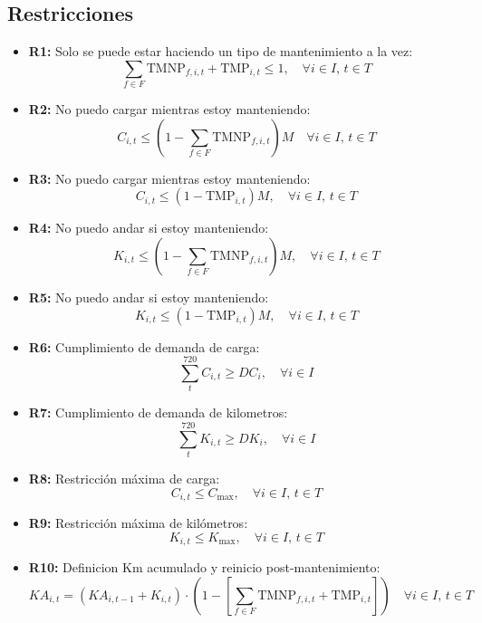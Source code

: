 \documentclass{article}
\begin{document}
\subsection{Restricciones}
\begin{itemize}
    \item \textbf{R1:} Solo se puede estar haciendo un tipo de mantenimiento a la vez:
    \[
    \sum_{f \in F} \text{TMNP}_{f,i,t} + \text{TMP}_{i,t} \leq 1, \quad \forall i \in I, \, t \in T
    \]
    
    \item \textbf{R2:} No puedo cargar mientras estoy manteniendo:
    \[
    C_{i,t} \leq \left(1 - \sum_{f \in F} \text{TMNP}_{f,i,t}\right) M \quad \forall i \in I, \, t \in T
    \]

    \item \textbf{R3:} No puedo cargar mientras estoy manteniendo:
    \[
    C_{i,t} \leq \left(1 - \text{TMP}_{i,t}\right) M, \quad \forall i \in I, \, t \in T
    \]

    \item \textbf{R4:} No puedo andar si estoy manteniendo:
    \[
    K_{i,t} \leq \left(1 - \sum_{f \in F} \text{TMNP}_{f,i,t}\right) M, \quad \forall i \in I, \, t \in T
    \]

    \item \textbf{R5:} No puedo andar si estoy manteniendo:
    \[
    K_{i,t} \leq \left(1 - \text{TMP}_{i,t}\right) M, \quad \forall i \in I, \, t \in T
    \]

    \item \textbf{R6:} Cumplimiento de demanda de carga:
    \[
    \sum_{t}^{720} C_{i,t} \geq DC_{i}, \quad \forall i \in I
    \]

    \item \textbf{R7:} Cumplimiento de demanda de kilometros:
    \[
    \sum_{t}^{720} K_{i,t} \geq DK_{i}, \quad \forall i \in I
    \]

    \item \textbf{R8:} Restricción máxima de carga:
    \[
    C_{i,t} \leq C_{\text{max}}, \quad \forall i \in I, \, t \in T
    \]
    
    \item \textbf{R9:} Restricción máxima de kilómetros:
    \[
    K_{i,t} \leq K_{\text{max}}, \quad \forall i \in I, \, t \in T
    \]

    \item \textbf{R10:} Definicion Km acumulado y reinicio post-mantenimiento:
    \[
    KA_{i,t} = (KA_{i,t-1} + K_{i,t}) \cdot (1 - [\sum_{f \in F}\text{TMNP}_{f, i, t} + \text{TMP}_{i,t}]) \quad \forall i \in I, \, t \in T
    \]


\end{itemize}
\end{document}
